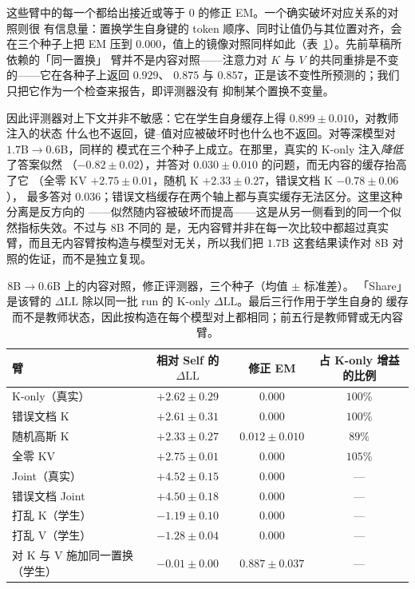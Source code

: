 \documentclass[11pt]{article}
\newcommand{\dll}{\Delta\text{LL}}
\begin{document}
这些臂中的每一个都给出接近或等于 $0$ 的修正 EM。一个确实破坏对应关系的对照则很
有信息量：置换学生自身键的 token 顺序、同时让值仍与其位置对齐，会在三个种子上把 EM 压到
$0.000$，值上的镜像对照同样如此（表~\ref{tab:controls}）。先前草稿所依赖的「同一置换」
臂并不是内容对照——注意力对 $K$ 与 $V$ 的共同重排是不变的——它在各种子上返回 $0.929$、
$0.875$ 与 $0.857$，正是该不变性所预测的；我们只把它作为一个检查来报告，即评测器没有
抑制某个置换不变量。

因此评测器对上下文并非不敏感：它在学生自身缓存上得 $0.899 \pm 0.010$，对教师注入的状态
什么也不返回，键--值对应被破坏时也什么也不返回。对等深模型对 $1.7$B$\to0.6$B，同样的
模式在三个种子上成立。在那里，真实的 K-only 注入\emph{降低}了答案似然
（$-0.82 \pm 0.02$），并答对 $0.030 \pm 0.010$ 的问题，而无内容的缓存抬高了它
（全零 KV $+2.75 \pm 0.01$，随机 K $+2.33 \pm 0.27$，错误文档 K $-0.78 \pm 0.06$），
最多答对 $0.036$；错误文档缓存在两个轴上都与真实缓存无法区分。这里这种分离是反方向的
——似然随内容被破坏而提高——这是从另一侧看到的同一个似然指标失效。不过与 $8$B 不同的
是，无内容臂并非在每一次比较中都超过真实臂，而且无内容臂按构造与模型对无关，所以我们把
$1.7$B 这套结果读作对 $8$B 对照的佐证，而不是独立复现。

\begin{table}[t]
\centering
\small
\caption{$8$B$\to0.6$B 上的内容对照，修正评测器，三个种子（均值 $\pm$ 标准差）。
「Share」是该臂的 $\dll$ 除以同一批 run 的 K-only $\dll$。最后三行作用于学生自身的
缓存而不是教师状态，因此按构造在每个模型对上都相同；前五行是教师臂或无内容臂。}
\label{tab:controls}
\begin{tabular}{lccc}
\toprule
臂 & 相对 Self 的 $\dll$ & 修正 EM & 占 K-only 增益的比例 \\
\midrule
K-only（真实）          & $+2.62{\pm}0.29$ & $0.000$ & $100\%$ \\
错误文档 K              & $+2.61{\pm}0.31$ & $0.000$ & $100\%$ \\
随机高斯 K              & $+2.33{\pm}0.27$ & $0.012{\pm}0.010$ & $89\%$ \\
全零 KV                 & $+2.75{\pm}0.01$ & $0.000$ & $105\%$ \\
Joint（真实）           & $+4.52{\pm}0.15$ & $0.000$ & --- \\
错误文档 Joint          & $+4.50{\pm}0.18$ & $0.000$ & --- \\
\midrule
打乱 K（学生）          & $-1.19{\pm}0.10$ & $0.000$ & --- \\
打乱 V（学生）          & $-1.28{\pm}0.04$ & $0.000$ & --- \\
对 K 与 V 施加同一置换（学生） & $-0.01{\pm}0.00$ & $0.887{\pm}0.037$ & --- \\
\bottomrule
\end{tabular}
\end{table}
\end{document}
